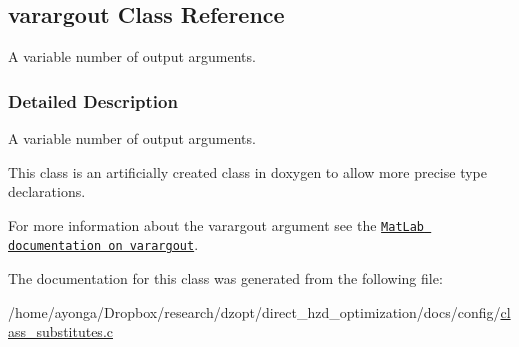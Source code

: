 \hypertarget{classvarargout}{}\subsection{varargout Class Reference}
\label{classvarargout}


A variable number of output arguments.  




\subsubsection{Detailed Description}
A variable number of output arguments. 

This class is an artificially created class in doxygen to allow more precise type declarations.

For more information about the varargout argument see the \href{http://www.mathworks.de/help/techdoc/ref/varargout.html}{\tt Mat\+Lab documentation on varargout}. 

The documentation for this class was generated from the following file\+:\begin{DoxyCompactItemize}
\item 
/home/ayonga/\+Dropbox/research/dzopt/direct\+\_\+hzd\+\_\+optimization/docs/config/\hyperlink{class__substitutes_8c}{class\+\_\+substitutes.\+c}\end{DoxyCompactItemize}
